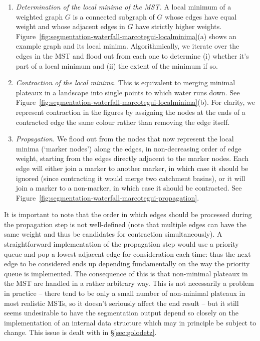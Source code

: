 \documentclass[preprint,a4paper]{elsarticle}
\begin{document}
\begin{enumerate}

\item \emph{Determination of the local minima of the MST.} A local minimum of a weighted graph $G$ is a connected subgraph of $G$ whose edges have equal weight and whose adjacent edges in $G$ have strictly higher weights. Figure~\ref{fig:segmentation-waterfall-marcotegui-localminima}(a) shows an example graph and its local minima. Algorithmically, we iterate over the edges in the MST and flood out from each one to determine (i) whether it's part of a local minimum and (ii) the extent of the minimum if so.

\item \emph{Contraction of the local minima.} This is equivalent to merging minimal plateaux in a landscape into single points to which water runs down. See Figure~\ref{fig:segmentation-waterfall-marcotegui-localminima}(b). For clarity, we represent contraction in the figures by assigning the nodes at the ends of a contracted edge the same colour rather than removing the edge itself.

\item \emph{Propagation.} We flood out from the nodes that now represent the local minima (`marker nodes') along the edges, in non-decreasing order of edge weight, starting from the edges directly adjacent to the marker nodes. Each edge will either join a marker to another marker, in which case it should be ignored (since contracting it would merge two catchment basins), or it will join a marker to a non-marker, in which case it should be contracted. See Figure~\ref{fig:segmentation-waterfall-marcotegui-propagation}.

\end{enumerate}

\noindent It is important to note that the order in which edges should be processed during the propagation step is not well-defined (note that multiple edges can have the same weight and thus be candidates for contraction simultaneously). A straightforward implementation of the propagation step would use a priority queue and pop a lowest adjacent edge for consideration each time: thus the next edge to be considered ends up depending fundamentally on the way the priority queue is implemented. The consequence of this is that non-minimal plateaux in the MST are handled in a rather arbitrary way. This is not necessarily a problem in practice -- there tend to be only a small number of non-minimal plateaux in most realistic MSTs, so it doesn't seriously affect the end result -- but it still seems undesirable to have the segmentation output depend so closely on the implementation of an internal data structure which may in principle be subject to change. This issue is dealt with in \S\ref{sec:golodetz}.
\end{document}
